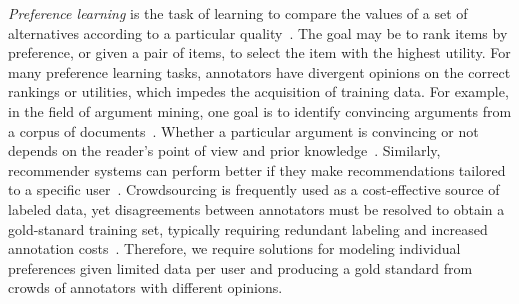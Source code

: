%
\emph{Preference learning} is the task of learning to compare the values of a set of alternatives
according to a particular quality~\citep{furnkranz2010preference}. The goal may be to 
rank items by preference, or given a pair of items, to select the item with the highest utility.
For many preference learning tasks, annotators have divergent opinions on the correct rankings or utilities,
which impedes the acquisition of training data.
For example, in the field of argument mining, one goal is to 
identify convincing arguments from a corpus of documents~\citep{habernal2016argument}. 
Whether a particular argument is convincing or not depends on the reader's point of view and prior knowledge~\citep{lukin2017argument}.
Similarly, recommender systems can perform better if they make recommendations tailored
to a specific user~\citep{resnick1997recommender}.
Crowdsourcing is frequently used as a cost-effective source of labeled data, 
yet disagreements between annotators must be resolved to obtain a gold-stanard
training set, typically requiring redundant labeling and increased annotation costs~\citep{snow2008cheap,banerji2010galaxy,gaunt2016training}.
Therefore, we require solutions for modeling individual preferences given
limited data per user and producing a gold standard from crowds of annotators with different opinions.

